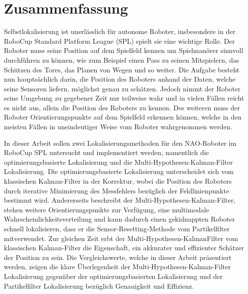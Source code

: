\thispagestyle{empty}
\chapter*{Zusammenfassung}

Selbstlokalisierung ist unerl{\"a}sslich f{\"u}r autonome Roboter, insbesondere in der RoboCup Standard Platform League (SPL) spielt sie eine wichtige Rolle. Der Roboter muss seine Position auf dem Spielfeld kennen um Spielman{\"o}ver sinnvoll durchf{\"u}hren zu k{\"o}nnen, wie zum Beispiel einen Pass zu seinen Mitspielern, das Sch{\"u}tzen des Tores, das Planen von Wegen und so weiter. Die Aufgabe besteht nun haupts{\"a}chlich darin, die Position des Roboters anhand der Daten, welche seine Sensoren liefern, m{\"o}glichst genau zu sch{\"a}tzen. Jedoch nimmt der Roboter seine Umgebung zu gegebener Zeit nur teilweise wahr und in vielen F{\"a}llen reicht es nicht aus, allein die Position des Roboters zu kennen. Des weiteren muss der Roboter Orientierungspunkte auf dem Spielfeld erkennen k{\"o}nnen, welche in den meisten F{\"a}llen in uneindeutiger Weise vom Roboter wahrgenommen werden.

In dieser Arbeit sollen zwei Lokalisierungsmethoden f{\"u}r den NAO-Roboter im RoboCup SPL untersucht und implementiert werden, namentlich die optimierungsbasierte Lokalisierung und die Multi-Hypothesen-Kalman-Filter Lokalisierung. Die optimierungsbasierte Lokalisierung unterscheidet sich vom klassischen Kalman-Filter in der Korrektur, wobei die Position des Roboters durch iterative Minimierung des Messfehlers bez{\"u}glich der Feldlinienpunkte bestimmt wird. Andererseits beschreibt der Multi-Hypothesen-Kalman-Filter, stehen weitere Orientierungspunkte zur Verf{\"u}gung, eine multimodale Wahrscheinlichkeitsverteilung und kann dadurch einen gekidnappten Roboter schnell lokalisieren, dass er die Sensor-Resetting-Methode vom Partikelfilter mitverwendet. Zur gleichen Zeit erbt der Multi-Hypothesen-KalmanFilter vom klassischen Kalman-Filter die Eigenschaft, ein akkurater und effizienter Sch{\"a}tzer der Position zu sein. Die Vergleichswerte, welche in dieser Arbeit pr{\"a}sentiert werden, zeigen die klare {\"U}berlegenheit der Multi-Hypothesen-Kalman-Filter Lokalisierung gegen{\"u}ber der optimierungsbasierten Lokalisierung und der Partikelfilter Lokalisierung bez{\"u}glich Genauigkeit und Effizienz.
